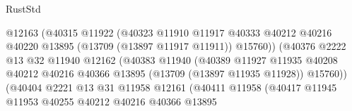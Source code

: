 \begin{lexlean}{RustStd}
\begin{coremodule}
                                            @12163
                                            (@40315
                                              @11922
                                              (@40323
                                                @11910
                                                @11917
                                                @40333
                                                @40212
                                                @40216
                                                @40220
                                                @13895
                                                (@13709 (@13897 @11917 @11911))
                                                @15760))
                                            (@40376
                                              @2222
                                              @13
                                              @32
                                              @11940
                                              @12162
                                              (@40383
                                                @11940
                                                (@40389
                                                  @11927
                                                  @11935
                                                  @40208
                                                  @40212
                                                  @40216
                                                  @40366
                                                  @13895
                                                  (@13709 (@13897 @11935 @11928))
                                                  @15760))
                                              (@40404
                                                @2221
                                                @13
                                                @31
                                                @11958
                                                @12161
                                                (@40411
                                                  @11958
                                                  (@40417
                                                    @11945
                                                    @11953
                                                    @40255
                                                    @40212
                                                    @40216
                                                    @40366
                                                    @13895

\end{coremodule}
\end{lexlean}
